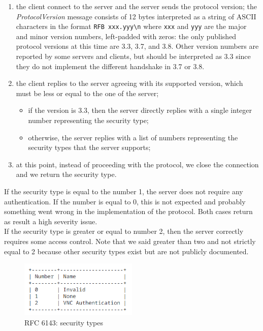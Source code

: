 \begin{enumerate}
  \item the client connect to the server and the server sends the protocol version; the \textit{ProtocolVersion} message consists of 12 bytes interpreted as a string of ASCII characters in the format \texttt{RFB xxx.yyy\textbackslash n} where \texttt{xxx} and \texttt{yyy} are the major and minor version numbers, left-padded with zeros: the only published protocol versions at this time are 3.3, 3.7, and 3.8. Other version numbers are reported by some servers and clients, but should be interpreted as 3.3 since they do not implement the different handshake in 3.7 or 3.8.
  \item the client replies to the server agreeing with its supported version, which must be less or equal to the one of the server;
        \begin{itemize}
          \item if the version is 3.3, then the server directly replies with a single integer number representing the security type;
          \item otherwise, the server replies with a list of numbers representing the security types that the server supports;
        \end{itemize}
  \item at this point, instead of proceeding with the protocol, we close the connection and we return the security type.
\end{enumerate}

If the security type is equal to the number 1, the server does not require any authentication. If the number is equal to 0, this is not expected and probably something went wrong in the implementation of the protocol. Both cases return as result a high severity issue. \\
If the security type is greater or equal to number 2, then the server correctly requires some access control. Note that we said greater than two and not strictly equal to 2 because other security types exist but are not publicly documented.

\begin{figure}[ht]
  \centering
  \includegraphics[width=0.5\textwidth]{chapters/05/assets/rfc6143-security-types}
  \caption{RFC 6143: security types}
  \label{fig:rfc6143-security-types}
\end{figure}

